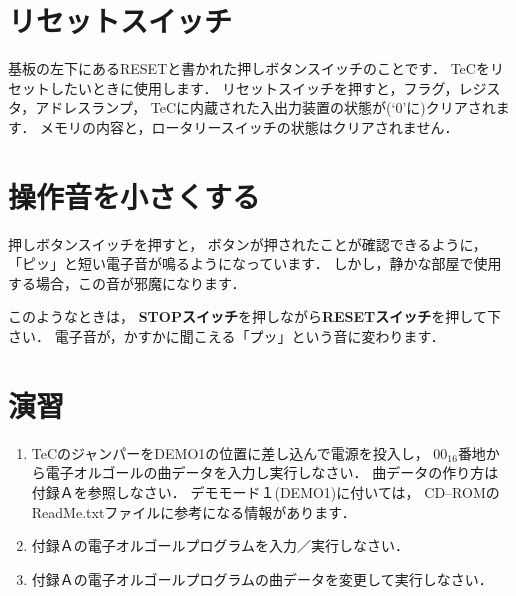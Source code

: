 \section{リセットスイッチ}
基板の左下にあるRESETと書かれた押しボタンスイッチのことです．
TeCをリセットしたいときに使用します．
リセットスイッチを押すと，フラグ，レジスタ，アドレスランプ，
TeCに内蔵された入出力装置の状態が(`0'に)クリアされます．
メモリの内容と，ロータリースイッチの状態はクリアされません．

\section{操作音を小さくする}
押しボタンスイッチを押すと，
ボタンが押されたことが確認できるように，
「ピッ」と短い電子音が鳴るようになっています．
しかし，静かな部屋で使用する場合，この音が邪魔になります．

このようなときは，
{\bf STOPスイッチ}を押しながら{\bf RESETスイッチ}を押して下さい．
電子音が，かすかに聞こえる「プッ」という音に変わります．

\section*{演習}
\begin{enumerate}
\item TeCのジャンパーをDEMO1の位置に差し込んで電源を投入し，
$00_{16}$番地から電子オルゴールの曲データを入力し実行しなさい．
曲データの作り方は付録Ａを参照しなさい．
デモモード１(DEMO1)に付いては，
CD--ROMのReadMe.txtファイルに参考になる情報があります．
\item 付録Ａの電子オルゴールプログラムを入力／実行しなさい．
\item 付録Ａの電子オルゴールプログラムの曲データを変更して実行しなさい．
\end{enumerate}

